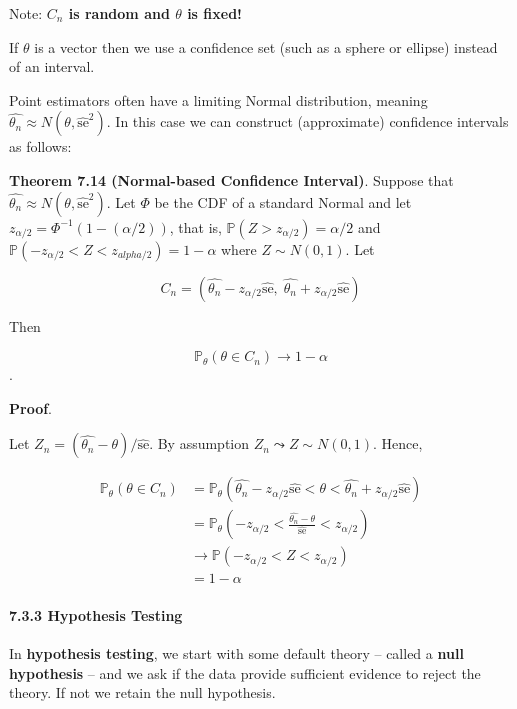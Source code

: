 Note: \textbf{\(C_{n}\) is random and \(\theta\) is fixed!}

If \(\theta\) is a vector then we use a confidence set (such as a sphere
or ellipse) instead of an interval.

Point estimators often have a limiting Normal distribution, meaning
\(\hat{\theta_{n}} \approx N(\theta, \hat{\text{se}}^{2})\). In this case we
can construct (approximate) confidence intervals as follows:

\textbf{Theorem 7.14 (Normal-based Confidence Interval)}. Suppose that
\(\hat{\theta_{n}} \approx N(\theta, \hat{\text{se}}^{2})\). Let \(\Phi\) be
the CDF of a standard Normal and let
\(z_{\alpha/2} = \Phi^{-1}\left(1 - (\alpha / 2)\right)\), that is,
\(\mathbb{P}(Z > z_{\alpha/2}) = \alpha/2\) and
\(\mathbb{P}(-z_{\alpha/2} < Z < z_{alpha/2}) = 1 - \alpha\) where
\(Z \sim N(0, 1)\). Let

\[ C_{n} = \left(\hat{\theta_{n}} - z_{\alpha/2} \hat{\text{se}}, \; \hat{\theta_{n}} + z_{\alpha/2} \hat{\text{se}}\right) \]

Then

\[ \mathbb{P}_\theta(\theta \in C_{n}) \rightarrow 1 - \alpha \].

\textbf{Proof}.

Let \(Z_{n} = (\hat{\theta_{n}} - \theta) / \hat{\text{se}}\). By assumption
\(Z_{n} \leadsto Z \sim N(0, 1)\). Hence,

\begin{align*}
\mathbb{P}_\theta(\theta \in C_{n}) 
& = \mathbb{P}_\theta \left(\hat{\theta_{n}} - z_{\alpha/2} \hat{\text{se}} < \theta < \hat{\theta_{n}} + z_{\alpha/2} \hat{\text{se}} \right) \\
& = \mathbb{P}_\theta \left(-z_{\alpha/2} < \frac{\hat{\theta_{n}} - \theta}{\hat{\text{se}}} < z_{\alpha/2} \right) \\
& \rightarrow \mathbb{P}\left(-z_{\alpha/2} < Z < z_{\alpha/2}\right) \\
&= 1 - \alpha
\end{align*}

\paragraph{7.3.3 Hypothesis Testing}\label{hypothesis-testing}

In \textbf{hypothesis testing}, we start with some default theory --
called a \textbf{null hypothesis} -- and we ask if the data provide
sufficient evidence to reject the theory. If not we retain the null
hypothesis.

